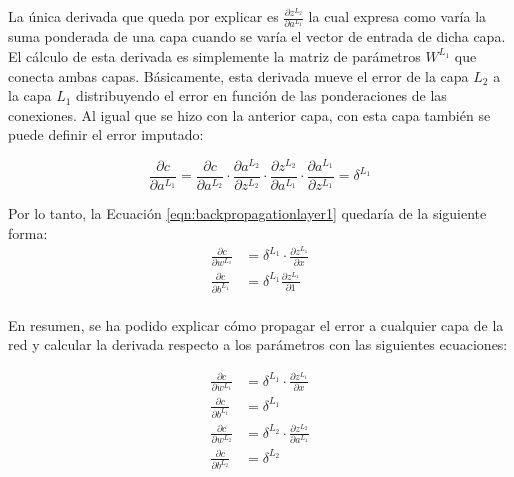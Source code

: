 La única derivada que queda por explicar es $\frac{\partial z^{L_2}}{\partial a^{L_1}}$ la cual expresa como varía la suma ponderada de una capa cuando se varía el vector de entrada de dicha capa. El cálculo de esta derivada es simplemente la matriz de parámetros $W^{L_1}$ que conecta ambas capas. Básicamente, esta derivada mueve el error de la capa $L_2$ a la capa $L_1$ distribuyendo el error en función de las ponderaciones de las conexiones. Al igual que se hizo con la anterior capa, con esta capa también se puede definir el error imputado:


\begin{equation}
   \frac{\partial c}{\partial a^{L_1}} = \frac{\partial c}{\partial a^{L_2}} \cdot \frac{\partial a^{L_2}}{\partial z^{L_2}} \cdot \frac{\partial z^{L_2}}{\partial a^{L_1}} \cdot \frac{\partial a^{L_1}}{\partial z^{L_1}} = \delta^{L_1}
\end{equation}

Por lo tanto, la Ecuación \ref{eqn:backpropagationlayer1} quedaría de la siguiente forma:
\begin{equation}
\begin{split}
     \frac{\partial c}{\partial w^{L_1}} &= \delta^{L_1} \cdot \frac{\partial z^{L_1}}{\partial x} \\
     \frac{\partial c}{\partial b^{L_1}} &= \delta^{L_1} \frac{\partial z^{L_1}}{\partial 1} \\
\end{split}
\end{equation}

En resumen, se ha podido explicar cómo propagar el error a cualquier capa de la red y calcular la derivada respecto a los parámetros con las siguientes ecuaciones:

\begin{equation}
\begin{split}
     \frac{\partial c}{\partial w^{L_1}} &= \delta^{L_1} \cdot \frac{\partial z^{L_1}}{\partial x} \\
     \frac{\partial c}{\partial b^{L_1}} &= \delta^{L_1} \\
     \frac{\partial c}{\partial w^{L_2}} &= \delta^{L_2} \cdot \frac{\partial z^{L_2}}{\partial a^{L_1}} \\
     \frac{\partial c}{\partial b^{L_2}} &= \delta^{L_2}
\end{split}
\end{equation}


